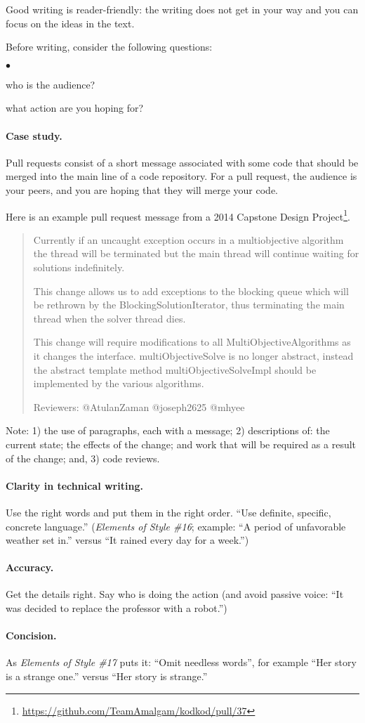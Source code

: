 \documentclass[11pt]{article}
\newcommand{\squishlist}{
 \begin{list}{$\bullet$}
  { \setlength{\itemsep}{0pt}
     \setlength{\parsep}{3pt}
     \setlength{\topsep}{3pt}
     \setlength{\partopsep}{0pt}
     \setlength{\leftmargin}{1.5em}
     \setlength{\labelwidth}{1em}
     \setlength{\labelsep}{0.5em} } }
\newcommand{\squishend}{
  \end{list}  }
\begin{document}
Good writing is reader-friendly: the writing does not get in your way and you can focus
on the ideas in the text.

Before writing, consider the following questions:
\squishlist
\item who is the audience?
\item what action are you hoping for?
\squishend

\paragraph{Case study.} Pull requests consist of a short message associated with some code that should be merged into the main line of a code repository.
For a pull request, the audience is your peers, and you are hoping that they will merge your code.

Here is an example pull request message from a 2014 Capstone Design Project\footnote{\url{https://github.com/TeamAmalgam/kodkod/pull/37}}. 

\begin{quote}
Currently if an uncaught exception occurs in a multiobjective algorithm the thread will be terminated but the main thread will continue waiting for solutions indefinitely.

This change allows us to add exceptions to the blocking queue which will be rethrown by the BlockingSolutionIterator, thus terminating the main thread when the solver thread dies.

This change will require modifications to all MultiObjectiveAlgorithms as it changes the interface.
multiObjectiveSolve is no longer abstract, instead the abstract template method multiObjectiveSolveImpl should be implemented by the various algorithms.

Reviewers: @AtulanZaman @joseph2625 @mhyee
\end{quote}
Note: 1) the use of paragraphs, each with a message; 2) descriptions of: the current state; the effects of the change; and work that will be required as a result of the change; and, 3) code reviews.

\paragraph{Clarity in technical writing.} Use the right words and put them in the right order. ``Use definite, specific, concrete language.'' (\emph{Elements of Style \#16}; example: ``A period of unfavorable weather set in.'' versus ``It rained every day for a week.'')

\paragraph{Accuracy.} Get the details right. Say who is doing the action (and avoid passive voice: ``It was decided to replace the professor with a robot.'')

\paragraph{Concision.} As \emph{Elements of Style \#17} puts it: ``Omit needless words'', for example ``Her story is a strange one.'' versus ``Her story is strange.''
\end{document}

